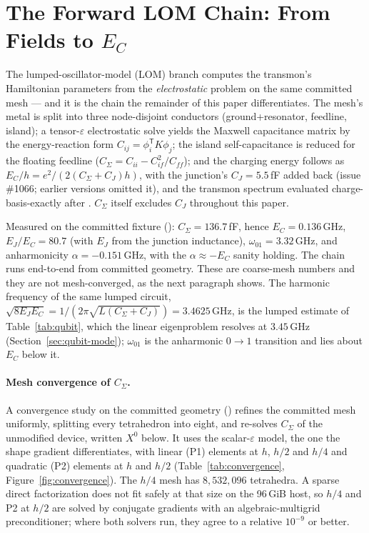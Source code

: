 \documentclass{anvil-paper}
\begin{document}
\section{The Forward LOM Chain: From Fields to \texorpdfstring{$E_C$}{E\_C}}
\label{sec:lom}

The lumped-oscillator-model (LOM) branch computes the transmon's
Hamiltonian parameters from the \emph{electrostatic} problem on the same
committed mesh --- and it is the chain the remainder of this paper
differentiates. The mesh's metal is split into three node-disjoint
conductors (ground+resonator, feedline, island); a tensor-$\varepsilon$
electrostatic solve yields the Maxwell capacitance matrix by the
energy-reaction form $C_{ij} = \phi_i^{\mathsf{T}} K \phi_j$; the island
self-capacitance is reduced for the floating feedline
($C_\Sigma = C_{ii} - C_{if}^2/C_{ff}$); and the charging energy follows
as $E_C/h = e^2/(2 (C_\Sigma + C_J) h)$, with the junction's
$C_J = 5.5$\,fF added back (issue \#1066; earlier versions omitted it),
and the transmon spectrum evaluated charge-basis-exactly after
\citet{koch2007}. $C_\Sigma$ itself excludes $C_J$ throughout this paper.

Measured on the committed fixture
(): $C_\Sigma =
136.7$\,fF, hence $E_C = 0.136$\,GHz, $E_J/E_C = 80.7$ (with $E_J$ from
the junction inductance), $\omega_{01} = 3.32$\,GHz, and anharmonicity
$\alpha = -0.151$\,GHz, with the $\alpha \approx -E_C$ sanity holding.
The chain runs end-to-end from committed geometry. These are
coarse-mesh numbers and they are not mesh-converged, as the next
paragraph shows. The harmonic frequency of the same lumped circuit,
$\sqrt{8E_JE_C} = 1/(2\pi\sqrt{L(C_\Sigma + C_J)}) = 3.4625$\,GHz, is
the lumped estimate of Table~\ref{tab:qubit}, which the linear
eigenproblem resolves at $3.45$\,GHz (Section~\ref{sec:qubit-mode});
$\omega_{01}$ is the anharmonic $0 \to 1$ transition and lies about
$E_C$ below it.

\paragraph{Mesh convergence of $C_\Sigma$.}
A convergence study on the committed geometry
() refines
the committed mesh uniformly, splitting every tetrahedron into eight,
and re-solves $C_\Sigma$ of the unmodified device, written $X^0$ below.
It uses the scalar-$\varepsilon$ model, the one the shape gradient
differentiates, with linear (P1) elements at $h$, $h/2$ and $h/4$ and
quadratic (P2) elements at $h$ and $h/2$
(Table~\ref{tab:convergence}, Figure~\ref{fig:convergence}). The $h/4$
mesh has $8{,}532{,}096$ tetrahedra. A sparse direct factorization does
not fit safely at that size on the 96\,GiB host, so $h/4$ and P2 at
$h/2$ are solved by conjugate gradients with an algebraic-multigrid
preconditioner; where both solvers run, they agree to a relative
$10^{-9}$ or better.
\end{document}

